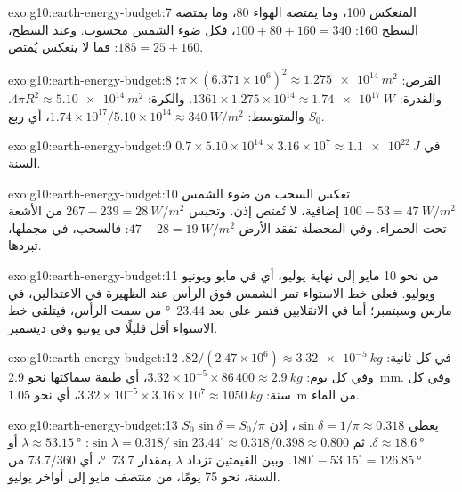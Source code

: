 \begin{solution}{exo:g10:earth-energy-budget:7}
المنعكس 100، وما يمتصه الهواء 80، وما يمتصه السطح 160:
$100 + 80 + 160 = 340$، فكل ضوء الشمس محسوب. وعند السطح،
$185 = 25 + 160$: فما لا ينعكس يُمتص.
\end{solution}

\begin{solution}{exo:g10:earth-energy-budget:8}
القرص: $\pi \times (6.371\times10^6)^2 \approx \qty{1.275e14}{m^2}$؛ والقدرة:
$1361 \times 1.275\times10^{14} \approx \qty{1.74e17}{W}$. والكرة: $4\pi
R^2 \approx \qty{5.10e14}{m^2}$. والمتوسط: $1.74\times10^{17}/5.10\times
10^{14} \approx \qty{340}{W/m^2}$، أي ربع $S_0$.
\end{solution}

\begin{solution}{exo:g10:earth-energy-budget:9}
$0.7 \times 5.10\times10^{14} \times 3.16\times10^7 \approx
\qty{1.1e22}{J}$ في السنة.
\end{solution}

\begin{solution}{exo:g10:earth-energy-budget:10}
تعكس السحب من ضوء الشمس $100 - 53 = \qty{47}{W/m^2}$ إضافية، لا تُمتص إذن.
وتحبس $267 - 239 = \qty{28}{W/m^2}$ من الأشعة تحت الحمراء. وفي المحصلة تفقد
الأرض $47 - 28 = \qty{19}{W/m^2}$: فالسحب، في مجملها، تبردها.
\end{solution}

\begin{solution}{exo:g10:earth-energy-budget:11}
من نحو 10 مايو إلى نهاية يوليو، أي في مايو ويونيو ويوليو. فعلى خط الاستواء تمر
الشمس فوق الرأس عند الظهيرة في الاعتدالين، في مارس وسبتمبر؛ أما في الانقلابين
فتمر على بعد \qty{23.44}{\degree} من سمت الرأس، فيتلقى خط الاستواء أقل قليلًا في
يونيو وفي ديسمبر.
\end{solution}

\begin{solution}{exo:g10:earth-energy-budget:12}
في كل ثانية: $82/(2.47\times10^6) \approx \qty{3.32e-5}{kg}$. وفي كل يوم:
$3.32\times10^{-5} \times 86\,400 \approx \qty{2.9}{kg}$، أي طبقة سماكتها نحو
\qty{2.9}{mm}. وفي كل سنة: $3.32\times10^{-5} \times 3.16\times10^7 \approx
\qty{1050}{kg}$، أي نحو \qty{1.05}{m} من الماء.
\end{solution}

\begin{solution}{exo:g10:earth-energy-budget:13}
$S_0 \sin\delta = S_0/\pi$ يعطي $\sin\delta = 1/\pi \approx 0.318$، إذن
$\delta \approx \qty{18.6}{\degree}$. ثم $\sin\lambda = 0.318/\sin 23.44^\circ
\approx 0.318/0.398 \approx 0.800$: $\lambda \approx \qty{53.15}{\degree}$ أو
$180^\circ - 53.15^\circ = \qty{126.85}{\degree}$. وبين القيمتين تزداد $\lambda$
بمقدار \qty{73.7}{\degree}، أي $73.7/360$ من السنة، نحو
\num{75} يومًا، من منتصف مايو إلى أواخر يوليو.
\end{solution}

